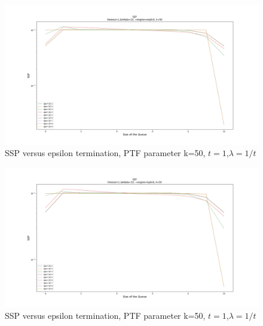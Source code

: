 \documentclass[paper=a4, fontsize=11pt]{scrartcl}
\numberwithin{equation}{section}		%
\numberwithin{figure}{section}			%
\numberwithin{table}{section}				%
\begin{document}
	\begin{figure}
		\centering
		\includegraphics[width=20cm]{picture/epsilon_explicit.png}
		\caption{SSP versus epsilon termination, PTF parameter k=50,	$t=1$,$\lambda=1/t$}
		\label{fig:epsilon_explicit}
	\end{figure}
	
	\begin{figure}
		\centering
		\includegraphics[width=20cm]{picture/epsilon_hybrid.png}
		\caption{SSP versus epsilon termination, PTF parameter k=50,	$t=1$,$\lambda=1/t$}
		\label{fig:epsilon_hybrid}
	\end{figure}

\end{document}
